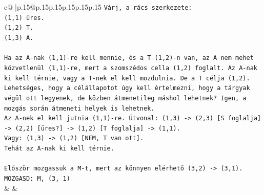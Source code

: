 \documentclass{article}
\begin{document}
{\begin{supertabular}{c@{$\;$}|p{.15\linewidth}@{}p{.15\linewidth}p{.15\linewidth}p{.15\linewidth}p{.15\linewidth}p{.15\linewidth}}
{{{\texttt{Várj, a rács szerkezete:} \\
\texttt{(1,1) üres.} \\
\texttt{(1,2) T.} \\
\texttt{(1,3) A.} \\
\\ 
\texttt{Ha az A{-}nak (1,1){-}re kell mennie, és a T (1,2){-}n van, az A nem mehet közvetlenül (1,1){-}re, mert a szomszédos cella (1,2) foglalt. Az A{-}nak ki kell térnie, vagy a T{-}nek el kell mozdulnia. De a T célja (1,2).} \\
\texttt{Lehetséges, hogy a célállapotot úgy kell értelmezni, hogy a tárgyak végül ott legyenek, de közben átmenetileg máshol lehetnek? Igen, a mozgás során átmeneti helyek is lehetnek.} \\
\texttt{Az A{-}nek el kell jutnia (1,1){-}re. Útvonal: (1,3) {-}> (2,3) {[}S foglalja{]} {-}> (2,2) {[}üres?{]} {-}> (1,2) {[}T foglalja{]} {-}> (1,1).} \\
\texttt{Vagy: (1,3) {-}> (1,2) {[}NEM, T van ott{]}.} \\
\texttt{Tehát az A{-}nak ki kell térnie.} \\
\\ 
\texttt{Először mozgassuk a M{-}t, mert az könnyen elérhető (3,2) {-}> (3,1).} \\
\texttt{MOZGASD: M, (3, 1)} \\
            }
        }
    }
    & & \\ \\


\end{supertabular}}
\end{document}
